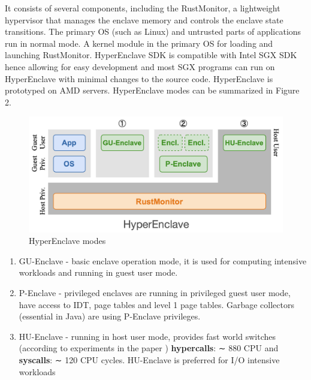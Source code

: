 \noindent
It consists of several components, including the RustMonitor, a lightweight hypervisor that manages the enclave memory and controls the enclave state transitions. The primary OS (such as Linux) and untrusted parts of applications run in normal mode.  A kernel module in the primary OS for loading and launching RustMonitor. HyperEnclave SDK is compatible with  Intel SGX SDK hence allowing for easy development and most SGX programs can run on HyperEnclave with minimal changes to the source code. HyperEnclave is prototyped on AMD servers.
HyperEnclave modes can be summarized in Figure 2.

\begin{figure}[H]
    \centerline{\includegraphics[scale=.15]{figures/hyperenclave_modes.png}}
    \caption{HyperEnclave modes}
    \label{fig}
\end{figure}


\begin{enumerate}[topsep=0pt, partopsep=0pt]
    \setlength\itemsep{-0.4em}
    \item GU-Enclave - basic enclave operation mode, it is used for computing intensive workloads and running in guest user mode. 
    \item P-Enclave -  privileged enclaves are running in privileged guest user mode, have access to IDT, page tables and level 1 page tables. Garbage collectors (essential in Java)  are using P-Enclave privileges. 
    \item HU-Enclave  -  running in host user mode,  provides fast world switches (according to experiments in the paper ) \textbf{hypercalls}: ∼ 880 CPU and \textbf{syscalls}: ∼ 120 CPU cycles. HU-Enclave is preferred for I/O intensive workloads
\end{enumerate}




